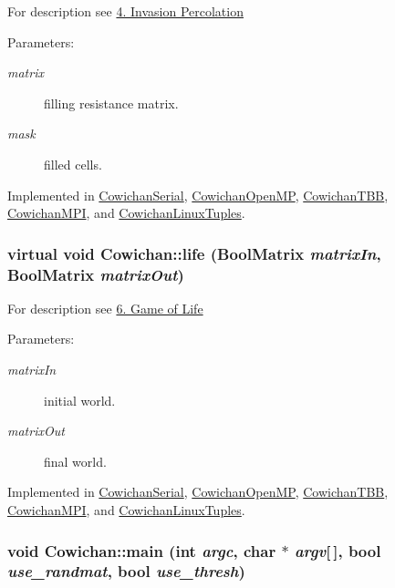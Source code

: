 For description see \hyperlink{index_invperc_sec}{4. Invasion Percolation} \begin{Desc}
\item[Parameters:]
\begin{description}
\item[{\em matrix}]filling resistance matrix. \item[{\em mask}]filled cells. \end{description}
\end{Desc}


Implemented in \hyperlink{class_cowichan_serial_9b1cf3fcbb40498609826433b8ea2f6a}{CowichanSerial}, \hyperlink{class_cowichan_open_m_p_4824c6b8509b5da835fbc5f64eb3e063}{CowichanOpenMP}, \hyperlink{class_cowichan_t_b_b_e4f9f8c31feea9b3a167fc2880a97610}{CowichanTBB}, \hyperlink{class_cowichan_m_p_i_bcd0f18fcccc8973ddaacf4dda190b53}{CowichanMPI}, and \hyperlink{class_cowichan_linux_tuples_5497a17a63cc5faad7afa54d013ea741}{CowichanLinuxTuples}.\hypertarget{class_cowichan_d449595ef2fe934bdd128ac8b1f51d07}{
\subsubsection[{life}]{\setlength{\rightskip}{0pt plus 5cm}virtual void Cowichan::life ({\bf BoolMatrix} {\em matrixIn}, \/  {\bf BoolMatrix} {\em matrixOut})}}
\label{class_cowichan_d449595ef2fe934bdd128ac8b1f51d07}


For description see \hyperlink{index_life_sec}{6. Game of Life} \begin{Desc}
\item[Parameters:]
\begin{description}
\item[{\em matrixIn}]initial world. \item[{\em matrixOut}]final world. \end{description}
\end{Desc}


Implemented in \hyperlink{class_cowichan_serial_ffd5b022c1d24226e11924094d8af349}{CowichanSerial}, \hyperlink{class_cowichan_open_m_p_d24f3ef01289b8f1bd7b864f585daa62}{CowichanOpenMP}, \hyperlink{class_cowichan_t_b_b_273e3e8a2e05108f59ec613472bfa363}{CowichanTBB}, \hyperlink{class_cowichan_m_p_i_9c739951d036ef7905bda7cb896e0edf}{CowichanMPI}, and \hyperlink{class_cowichan_linux_tuples_967138bbdead76eec50f31465dd9d5f1}{CowichanLinuxTuples}.\hypertarget{class_cowichan_905f3eb45f21cdaa1c32a421d001fa4c}{
\subsubsection[{main}]{\setlength{\rightskip}{0pt plus 5cm}void Cowichan::main (int {\em argc}, \/  char $\ast$ {\em argv}\mbox{[}$\,$\mbox{]}, \/  bool {\em use\_\-randmat}, \/  bool {\em use\_\-thresh})}}
\label{class_cowichan_905f3eb45f21cdaa1c32a421d001fa4c}


